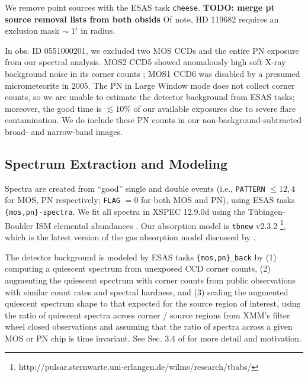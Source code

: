 \documentclass[preprint2,tighten,trackchanges]{aastex6}
\begin{document}
We remove point sources with the ESAS task \texttt{cheese}.
\textbf{TODO: merge pt source removal lists from both obsids}  %
Of note, HD 119682 requires an exclusion mask $\sim 1\mbox{$^\prime$}$ in radius.

In obs. ID 0551000201, we excluded two MOS CCDs and the entire PN exposure from
our spectral analysis.
MOS2 CCD5 showed anomalously high soft X-ray background noise in its corner
counts \citep[cf.][]{kuntz2008}; MOS1 CCD6 was disabled by a presumed
micrometeorite in 2005.
The PN in Large Window mode does not collect corner counts, so we are unable to
estimate the detector background from ESAS tasks; moreover, the good time is
$\lesssim 10\%$ of our available exposures due to severe flare contamination.
We do include these PN counts in our non-background-subtracted broad- and
narrow-band images.


\subsection{Spectrum Extraction and Modeling}

Spectra are created from ``good'' single and double events (i.e.,
\texttt{PATTERN} $\leq 12,4$ for MOS, PN respectively; \texttt{FLAG} $= 0$ for
both MOS and PN), using ESAS tasks \texttt{\{mos,pn\}-spectra}.
We fit all spectra in XSPEC 12.9.0d \citep{arnaud1996}
using the T{\"u}bingen-Boulder ISM elemental abundances \citep{wilms2000}.
Our absorption model is \texttt{tbnew} v2.3.2
\footnote{http://pulsar.sternwarte.uni-erlangen.de/wilms/research/tbabs/},
which is the latest version of the gas absorption model discussed by
\citet{wilms2000}.

The detector background is modeled by ESAS tasks \texttt{\{mos,pn\}\_back}
by (1) computing a quiescent spectrum from unexposed CCD corner counts,
(2) augmenting the quiescent spectrum with corner counts from public
observations with similar count rates and spectral hardness, and (3) scaling
the augmented quiescent spectrum shape to that expected for the source region
of interest, using the ratio of quiescent spectra across corner / source
regions from XMM's filter wheel closed observations and assuming that the ratio
of spectra across a given MOS or PN chip is time invariant.
See Sec. 3.4 of \citet{kuntz2008} for more detail and motivation.
\end{document}
